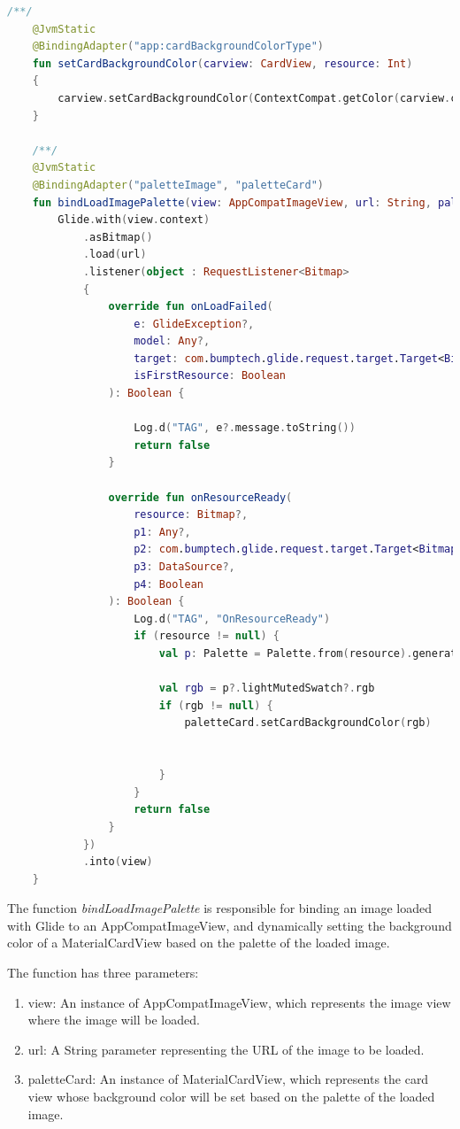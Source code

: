 \documentclass[a4paper, 12pt]{article}
\begin{document}
\begin{lstlisting}[caption={New Custom Bindings.}, label={code:binding_region_code}, language=Kotlin]
    /**/
    @JvmStatic
    @BindingAdapter("app:cardBackgroundColorType")
    fun setCardBackgroundColor(carview: CardView, resource: Int)
    {
        carview.setCardBackgroundColor(ContextCompat.getColor(carview.context,resource))
    }

    /**/
    @JvmStatic
    @BindingAdapter("paletteImage", "paletteCard")
    fun bindLoadImagePalette(view: AppCompatImageView, url: String, paletteCard: MaterialCardView) {
        Glide.with(view.context)
            .asBitmap()
            .load(url)
            .listener(object : RequestListener<Bitmap>
            {
                override fun onLoadFailed(
                    e: GlideException?,
                    model: Any?,
                    target: com.bumptech.glide.request.target.Target<Bitmap>?,
                    isFirstResource: Boolean
                ): Boolean {

                    Log.d("TAG", e?.message.toString())
                    return false
                }

                override fun onResourceReady(
                    resource: Bitmap?,
                    p1: Any?,
                    p2: com.bumptech.glide.request.target.Target<Bitmap>?,
                    p3: DataSource?,
                    p4: Boolean
                ): Boolean {
                    Log.d("TAG", "OnResourceReady")
                    if (resource != null) {
                        val p: Palette = Palette.from(resource).generate()

                        val rgb = p?.lightMutedSwatch?.rgb
                        if (rgb != null) {
                            paletteCard.setCardBackgroundColor(rgb)


                        }
                    }
                    return false
                }
            })
            .into(view)
    }
\end{lstlisting}

The function \textit{bindLoadImagePalette} is responsible for binding an image loaded with Glide to an AppCompatImageView, and dynamically setting the background color of a MaterialCardView based on the palette of the loaded image.

The function has three parameters:
\begin{enumerate}
    \item view: An instance of AppCompatImageView, which represents the image view where the image will be loaded.
    \item url: A String parameter representing the URL of the image to be loaded.
    \item paletteCard: An instance of MaterialCardView, which represents the card view whose background color will be set based on the palette of the loaded image.
\end{enumerate}
\end{document}
